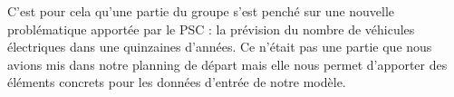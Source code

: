 	C'est pour cela qu'une partie du groupe s'est penché sur une nouvelle problématique apportée par le PSC : la prévision du nombre de véhicules électriques dans une quinzaines d'années. Ce n'était pas une partie que nous avions mis dans notre planning de départ mais elle nous permet d'apporter des éléments concrets pour les données d'entrée de notre modèle.
	